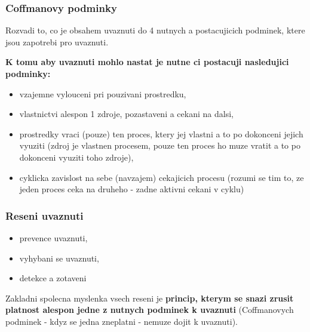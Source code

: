 \documentclass[a4paper, 11pt]{article}
\begin{document}
\subsubsection{Coffmanovy podminky}
Rozvadi to, co je obsahem uvaznuti do 4 nutnych a postacujicich podminek, ktere jsou zapotrebi pro uvaznuti. 

\textbf{K tomu aby uvaznuti mohlo nastat je nutne ci postacuji nasledujici podminky:}
\begin{itemize}
    \item vzajemne vylouceni pri pouzivani prostredku,
    \item vlastnictvi alespon 1 zdroje, pozastaveni a cekani na dalsi,
    \item prostredky vraci (pouze) ten proces, ktery jej vlastni a to po dokonceni jejich vyuziti (zdroj je vlastnen procesem, pouze ten proces ho muze vratit a to po dokonceni vyuziti toho zdroje),
    \item cyklicka zavislost na sebe (navzajem) cekajicich procesu (rozumi se tim to, ze jeden proces ceka na druheho - zadne aktivni cekani v cyklu) \\
\end{itemize}

\subsubsection{Reseni uvaznuti}
\begin{itemize}
    \item prevence uvaznuti,
    \item vyhybani se uvaznuti,
    \item detekce a zotaveni \\
\end{itemize}

Zakladni spolecna myslenka vsech reseni je \textbf{princip, kterym se snazi zrusit platnost alespon jedne z nutnych podminek k uvaznuti} (Coffmanovych podminek - kdyz se jedna zneplatni - nemuze dojit k uvaznuti). \\
\end{document}
